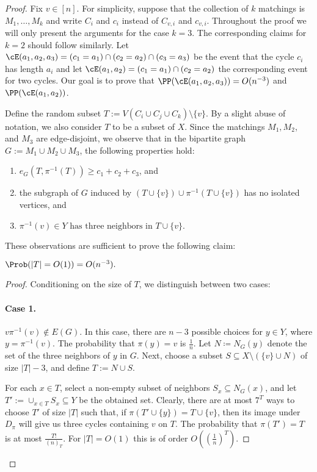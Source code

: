 \documentclass{article}
\begin{document}
\begin{proof}
Fix $v \in [n]$. For simplicity, suppose that the collection of $k$ matchings is $M_1, \ldots, M_k$ and write $C_i$ and $c_i$ instead of $C_{v,i}$ and $c_{v,i}$. Throughout the proof we will only present the arguments for the case $k=3$. The corresponding claims for $k=2$ should follow similarly. Let $\cE(a_1,a_2,a_3)= (c_1=a_1)\cap (c_2=a_2) \cap (c_3=a_3)$ be the event that the cycle $c_i$ has length $a_i$ and let $\cE(a_1,a_2)=(c_1=a_1)\cap (c_2=a_2)$ the corresponding event for two cycles. Our goal is to prove that $\PP(\cE(a_1,a_2,a_3))=O(n^{-3})$ and $\PP(\cE(a_1,a_2))$.

 Define the random subset $T:=V\left(C_i\cup C_j\cup C_k\right)\setminus \{v\}$. By a slight abuse of notation, we also consider $T$ to be a subset of $X$. Since the matchings $M_1,M_2$, and $M_3$ are edge-disjoint, we observe that in the bipartite graph $G:=M_1\cup M_2\cup M_3$, the following properties hold:
 \begin{enumerate}
     \item $e_G\left(T,\pi^{-1}(T)\right)\geq c_1+c_2+c_3$, and
     \item the subgraph of $G$ induced by $(T\cup \{v\})\cup\pi^{-1}(T\cup\{v\})$ has no isolated vertices, and
     \item $\pi^{-1}(v)\in Y \textrm{ has three neighbors in } T \cup \{v\}.$
 \end{enumerate}

 These observations are sufficient to prove the following claim:

\begin{claim}\label{clm:cyclesbig}
    $\Prob(|T|=O(1))=O(n^{-3}).$
\end{claim} 

\begin{proof}
    Conditioning on the size of $T$, we distinguish between two cases: 
    \paragraph{\bf{Case 1.}} $v\pi^{-1}(v)\notin E(G)$. In this case, there are $n-3$ possible choices for $y\in Y$, where $y=\pi^{-1}(v)$. The probability that $\pi(y)=v$ is $\frac{1}{n}$. Let $N\coloneqq N_G(y)$ denote the set of the three neighbors of $y$ in $G$. Next, choose a subset $S\subseteq X \setminus \left(\{v\}\cup N\right)$ of size $|T|-3$, and define $T:= N\cup S$. 
    
    For each $x\in T$, select a non-empty subset of neighbors $S_x\subseteq N_G(x)$, and let $T':=\cup_{x\in T} S_x\subseteq Y$ be the obtained set. Clearly, there are at most $7^T$ ways to choose $T'$ of size $|T|$ such that, if $\pi(T'\cup \{y\})=T\cup\{v\}$, then its image under $D_{\pi}$ will give us three cycles containing $v$ on $T$. The probability that $\pi(T')=T$ is at most $\frac{T!}{(n)_{T}}$. For $|T|=O(1)$ this is of order $O\left(\left(\frac{1}{n}\right)^{T}\right)$.


\end{proof}
\end{proof}
\end{document}
